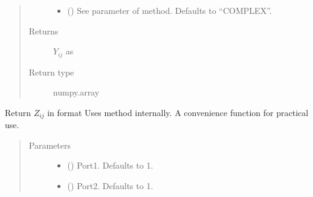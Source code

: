 \documentclass[letterpaper,10pt,english]{sphinxmanual}
\begin{document}
\begin{fulllineitems}
\begin{fulllineitems}
\begin{quote}
\begin{description}
\begin{itemize}
\item {} 
 (\sphinxstyleliteralemphasis{\sphinxupquote{, }}) \textendash{} See  parameter of  method. Defaults to “COMPLEX”.

\end{itemize}

\item[{Returns}] \leavevmode
\(Y_{i j}\) as 

\item[{Return type}] \leavevmode
numpy.array

\end{description}\end{quote}

\end{fulllineitems}


\begin{fulllineitems}
\label{\detokenize{touchstone:touchstone.spfile.Z}}
Return \(Z_{i j}\) in format 
Uses  method internally. A convenience function for practical use.
\begin{quote}\begin{description}
\item[{Parameters}] \leavevmode\begin{itemize}
\item {} 
 (\sphinxstyleliteralemphasis{\sphinxupquote{, }}) \textendash{} Port\sphinxhyphen{}1. Defaults to 1.

\item {} 
 (\sphinxstyleliteralemphasis{\sphinxupquote{, }}) \textendash{} Port\sphinxhyphen{}2. Defaults to 1.


\end{itemize}
\end{description}
\end{quote}
\end{fulllineitems}
\end{fulllineitems}
\end{document}
